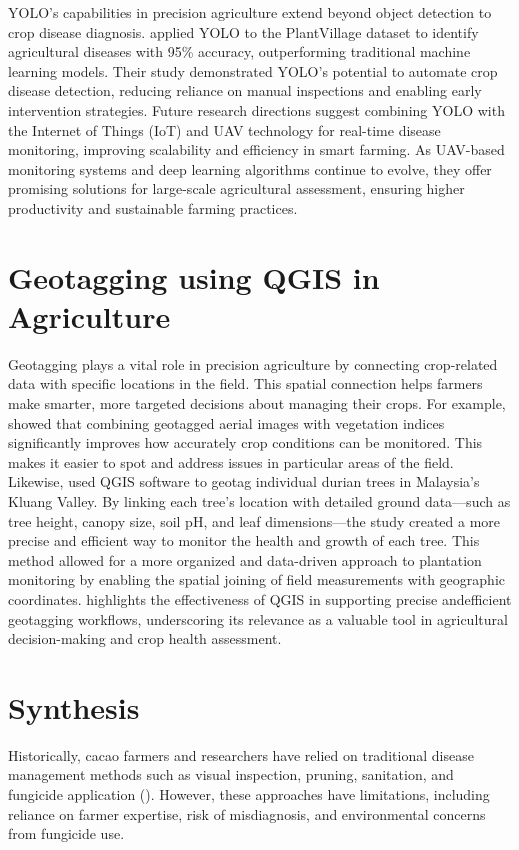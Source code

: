 YOLO’s capabilities in precision agriculture extend beyond object detection to crop disease diagnosis. \cite{Vyas2023} applied YOLO to the PlantVillage dataset to identify agricultural diseases with 95\% accuracy, outperforming traditional machine learning models. Their study demonstrated YOLO’s potential to automate crop disease detection, reducing reliance on manual inspections and enabling early intervention strategies. Future research directions suggest combining YOLO with the Internet of Things (IoT) and UAV technology for real-time disease monitoring, improving scalability and efficiency in smart farming. As UAV-based monitoring systems and deep learning algorithms continue to evolve, they offer promising solutions for large-scale agricultural assessment, ensuring higher productivity and sustainable farming practices.


\section{Geotagging using QGIS in Agriculture}
Geotagging plays a vital role in precision agriculture by connecting crop-related data with specific locations in the field. This spatial connection helps farmers make smarter, more targeted decisions about managing their crops. For example, \cite{Mohidem2021} showed that combining geotagged aerial images with vegetation indices significantly improves how accurately crop conditions can be monitored. This makes it easier to spot and address issues in particular areas of the field. Likewise, \cite{Rahman2021} used QGIS software to geotag individual durian trees in Malaysia’s Kluang Valley. By linking each tree’s location with detailed ground data—such as tree height, canopy size, soil pH, and leaf dimensions—the study created a more precise and efficient way to monitor the health and growth of each tree. This method allowed for a more organized and data-driven approach to plantation monitoring by enabling the spatial joining of field measurements with geographic coordinates. \cite{Rahman2021} highlights the effectiveness of QGIS in supporting precise andefficient geotagging workflows, underscoring its relevance as a valuable tool in agricultural decision-making and crop health assessment.

\section{Synthesis}
Historically, cacao farmers and researchers have relied on traditional disease management methods such as visual inspection, pruning, sanitation, and fungicide application (\cite{AceboGuerrero2012, Aneani2007}). However, these approaches have limitations, including reliance on farmer expertise, risk of misdiagnosis, and environmental concerns from fungicide use.

